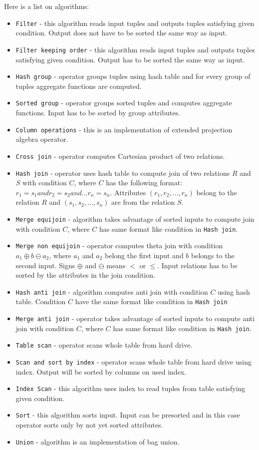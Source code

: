 Here is a list on algorithms:
\begin{itemize}
\item \texttt{Filter} - this algorithm reads input tuples and outputs tuples satisfying given condition. Output does not have to be sorted the same way as input.
\item \texttt{Filter~keeping~order} - this algorithm reads input tuples and outputs tuples satisfying given condition. Output has to be sorted the same way as input.
\item \texttt{Hash~group} - operator groups tuples using hash table and for every group of tuples aggregate functions are computed.
\item \texttt{Sorted~group} - operator groups sorted tuples and computes aggregate functions. Input has to be sorted by group attributes.
\item \texttt{Column~operations} - this is an implementation of extended projection algebra operator. 
\item \texttt{Cross~join} - operator computes Cartesian product of two relations.
\item \texttt{Hash~join} - operator uses hash table to compute join of two relations $R$ and $S$ with condition $C$, where $C$ has the following format: $r_1=s_1 and r_2=s_2 and ... r_n=s_n$. Attributes $(r_1,r_2,...,r_n)$ belong to the relation $R$ and $(s_1,s_2,...,s_n)$ are from the relation $S$.
\item \texttt{Merge~equijoin} - algorithm takes advantage of sorted inputs to compute join with condition $C$, where $C$ has same format like condition in \texttt{Hash~join}. 
\item \texttt{Merge~non~equijoin} - operator computes theta join with condition $a_1\oplus b \ominus a_2$, where $a_1$ and $a_2$ belong the first input and $b$ belongs to the second input. Signs $\oplus$ and $\ominus$ means $<$ or $\leq$. Input relations has to be sorted by the attributes in the join condition.
\item \texttt{Hash~anti~join} -  algorithm computes anti join with condition $C$  using hash table. Condition $C$ have the same format like condition in \texttt{Hash~join}
\item \texttt{Merge~anti~join} - operator takes advantage of sorted inputs to compute anti join with condition $C$, where $C$ has same format like condition in \texttt{Hash~join}. 
\item \texttt{Table~scan} - operator scans whole table from hard drive.
\item \texttt{Scan~and~sort~by~index} - operator scans whole table from hard drive using index. Output will be sorted by columns on used index.
\item \texttt{Index~Scan} - this algorithm uses index to read tuples from table satisfying given condition.
\item \texttt{Sort} - this algorithm sorts input. Input can be presorted and in this case operator sorts only by not yet sorted attributes.
\item \texttt{Union} - algorithm is an implementation of bag union.

\end{itemize}


